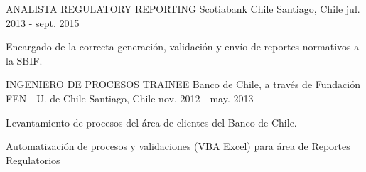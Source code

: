 \begin{cventries}
  \cventry
    {ANALISTA REGULATORY REPORTING} %
    {Scotiabank Chile} %
    {Santiago, Chile} %
    {jul. 2013 - sept. 2015} %
    {
      \begin{cvitems} %
        \item {Encargado de la correcta generación, validación y envío de reportes normativos a la SBIF.}
      \end{cvitems}
    }



\cventry
  {INGENIERO DE PROCESOS TRAINEE} %
  {Banco de Chile, a través de Fundación FEN - U. de Chile} %
  {Santiago, Chile} %
  {nov. 2012 - may. 2013} %
  {
    \begin{cvitems} %
      \item {Levantamiento de procesos del área de clientes del Banco de Chile.}
      \item {Automatización de procesos y validaciones (VBA Excel) para área de Reportes Regulatorios}
    \end{cvitems}
  }

\end{cventries}
